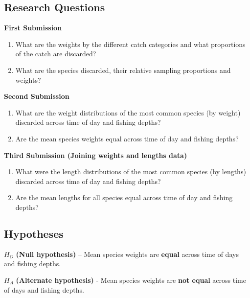 \documentclass[
]{book}
\providecommand{\tightlist}{%
  \setlength{\itemsep}{0pt}\setlength{\parskip}{0pt}}
\begin{document}
\hypertarget{research-questions}{%
\subsection{Research Questions}\label{research-questions}}

\textbf{First Submission}

\begin{enumerate}
\def\labelenumi{\arabic{enumi}.}
\tightlist
\item
  What are the weights by the different catch categories and what proportions of the catch are discarded?
\item
  What are the species discarded, their relative sampling proportions and weights?
\end{enumerate}

\textbf{Second Submission}

\begin{enumerate}
\def\labelenumi{\arabic{enumi}.}
\setcounter{enumi}{2}
\tightlist
\item
  What are the weight distributions of the most common species (by weight) discarded across time of day and fishing depths?
\item
  Are the mean species weights equal across time of day and fishing depths?
\end{enumerate}

\textbf{Third Submission (Joining weights and lengths data)}

\begin{enumerate}
\def\labelenumi{\arabic{enumi}.}
\setcounter{enumi}{4}
\tightlist
\item
  What were the length distributions of the most common species (by lengths) discarded across time of day and fishing depths?
\item
  Are the mean lengths for all species equal across time of day and fishing depths?
\end{enumerate}

\hypertarget{hypotheses}{%
\subsection{Hypotheses}\label{hypotheses}}

\(H_O\) \textbf{(Null hypothesis)} -- Mean species weights are \textbf{equal} across time of days and fishing depths.

\(H_A\) \textbf{(Alternate hypothesis)} - Mean species weights are \textbf{not equal} across time of days and fishing depths.
\end{document}

